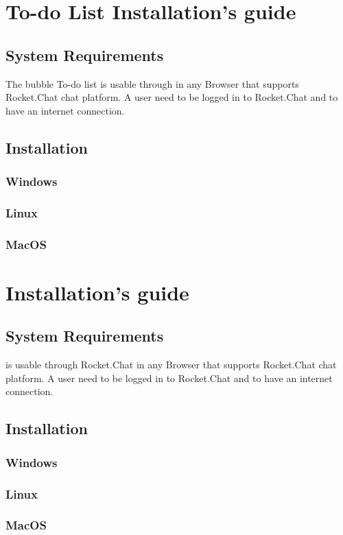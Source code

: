 \section{To-do List Installation's guide}

\subsection{System Requirements}
The bubble To-do list is usable through  in any Browser that supports Rocket.Chat chat platform.
A user need to be logged in to Rocket.Chat and to have an internet connection.

\subsection{Installation}

\subsubsection{Windows}

\subsubsection{Linux}

\subsubsection{MacOS}

\section{\DemoName{} Installation's guide}

\subsection{ \DemoName{} System Requirements}
\DemoName{} is usable through Rocket.Chat in any Browser that supports Rocket.Chat chat platform.
A user need to be logged in to Rocket.Chat and to have an internet connection.

\subsection{Installation}

\subsubsection{Windows}

\subsubsection{Linux}

\subsubsection{MacOS}
